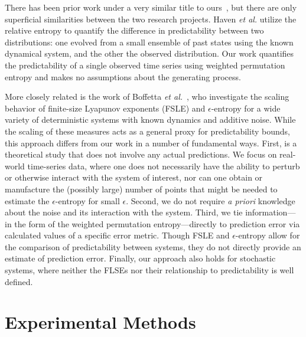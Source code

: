 \documentclass[%
pre,
reprint,
superscriptaddress,
showpacs,
nofootinbib,
nobibnotes,
 amsmath,amssymb,
 aps,
]{revtex4-1}
\newcommand{\cmark}{\ding{51}}
\newcommand{\gcc}{{\tt 403.gcc}\xspace}
\newcommand{\svd}{{\tt dgesdd}\xspace}
\newcommand{\col}{{\tt col\_major}\xspace}
\begin{document}
There has been prior work under a very similar title to
ours~\cite{haven2005}, but there are only superficial similarities
between the two research projects. Haven \emph{et al.} utilize the
relative entropy to quantify the difference in predictability between
two distributions: one evolved from a small ensemble of past states
using the known dynamical system, and the other the observed
distribution. Our work quantifies the predictability of a single
observed time series using weighted permutation entropy and makes no
assumptions about the generating process.

More closely related is the work of Boffetta \emph{et
  al.}~\cite{boffetta02}, who investigate the scaling behavior of
finite-size Lyapunov exponents (FSLE) and $\epsilon$-entropy for a
wide variety of deterministic systems with known dynamics and additive
noise.  While the scaling of these measures acts as a general proxy
for predictability bounds, this approach differs from our work in a
number of fundamental ways.  First, \cite{boffetta02} is a theoretical
study that does not involve any actual predictions.  We focus on
real-world time-series data, where one does not necessarily have the
ability to perturb or otherwise interact with the system of interest,
nor can one obtain or manufacture the (possibly large) number of
points that might be needed to estimate the $\epsilon$-entropy for
small $\epsilon$.  Second, we do not require \emph{a priori} knowledge
about the noise and its interaction with the system.  Third, we tie
information---in the form of the weighted permutation
entropy---directly to prediction error via calculated values of a
specific error metric.  Though FSLE and $\epsilon$-entropy allow for
the comparison of predictability between systems, they do not directly
provide an estimate of prediction error.  Finally, our approach also
holds for stochastic systems, where neither the FLSEs nor their
relationship to predictability is well defined.
\section{Experimental Methods}\label{sec:methods}
\end{document}

